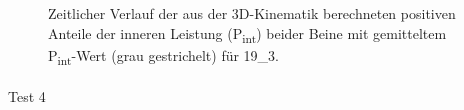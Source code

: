 \documentclass[
  letterpaper,
  DIV=11]{scrartcl}
\makeatletter
\let\oldparagraph\paragraph
\renewcommand{\paragraph}{
    \@ifstar
      \xxxParagraphStar
      \xxxParagraphNoStar
  }
\newcommand{\xxxParagraphStar}[1]{\oldparagraph*{#1}\mbox{}}
\newcommand{\xxxParagraphNoStar}[1]{\oldparagraph{#1}\mbox{}}
\makeatother
\begin{document}
\begin{figure}


\caption{\label{fig-PInt_Kinematik_19_3}Zeitlicher Verlauf der aus der
3D-Kinematik berechneten positiven Anteile der inneren Leistung
(P\textsubscript{int}) beider Beine mit gemitteltem
P\textsubscript{int}-Wert (grau gestrichelt) für 19\_3.}

\end{figure}%

\paragraph{Test 4}
\end{document}
